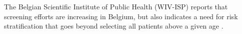 The Belgian Scientific Institute of Public Health (WIV-ISP) reports that screening efforts are increasing in Belgium, but also indicates a need for risk stratification that goes beyond selecting all patients above a given age \citep{wivisp}.



















